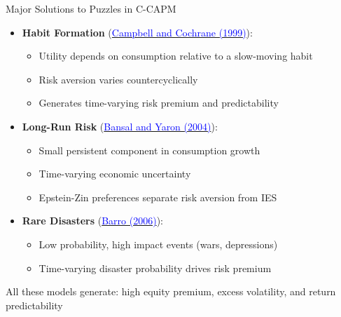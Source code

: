 \documentclass{beamer}
\begin{document}
\begin{frame}{Major Solutions to Puzzles in C-CAPM}
	\begin{itemize}
		\item \textbf{Habit Formation} (\href{https://doi.org/10.1086/250059}{\textcolor{blue}{Campbell and Cochrane (1999)}}):
		\begin{itemize}
			\item Utility depends on consumption relative to a slow-moving habit
			\item Risk aversion varies countercyclically
			\item Generates time-varying risk premium and predictability
		\end{itemize}
		\item \textbf{Long-Run Risk} (\href{https://doi.org/10.1111/j.1540-6261.2004.00670.x}{\textcolor{blue}{Bansal and Yaron (2004)}}):
		\begin{itemize}
			\item Small persistent component in consumption growth
			\item Time-varying economic uncertainty
			\item Epstein-Zin preferences separate risk aversion from IES
		\end{itemize}
		\item \textbf{Rare Disasters} (\href{https://doi.org/10.1162/qjec.121.3.823}{\textcolor{blue}{Barro (2006)}}):
		\begin{itemize}
			\item Low probability, high impact events (wars, depressions)
			\item Time-varying disaster probability drives risk premium
		\end{itemize}
	\end{itemize}
	
	\vspace{5pt}
	All these models generate: high equity premium, excess volatility, and return predictability
\end{frame}
\end{document}
